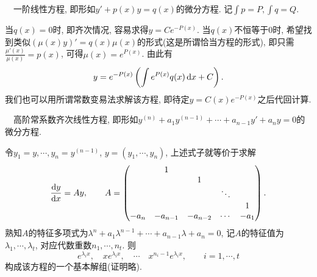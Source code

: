 ~~一阶线性方程, 即形如$y' + p(x)y=q(x)$的微分方程. 记$\int p = P, \int q = Q$. 

当$q(x)=0$时, 即齐次情况, 容易求得$y=Ce^{-P(x)}$. 当$q(x)$不恒等于$0$时, 希望找到类似$(\mu (x) y)'=q(x)\mu (x)$的形式(这是所谓恰当方程的形式), 即只需$\frac{\mu '(x)}{\mu (x)} = p(x)$, 可得$\mu (x) = e^{P(x)}$. 由此有$$y=e^{-P(x)}\left( \int e^{P(x)}q(x) \mathop{}\!\mathrm{d} x + C \right).$$
我们也可以用所谓常数变易法求解该方程, 即待定$y=C(x)e^{-P(x)}$之后代回计算. 

~~高阶常系数齐次线性方程, 即形如$y^{(n)}+a_1y^{(n-1)} + \cdots + a_{n-1}y'+a_ny=0$的微分方程. 

令$y_1=y,\cdots ,y_n=y^{(n-1)}$, $y=(y_1,\cdots ,y_n)$, 上述式子就等价于求解$$\frac{\mathop{}\!\mathrm{d} y}{\mathop{}\!\mathrm{d} x} = Ay,\qquad A=\begin{pmatrix}
  & 1 &  &  &   \\
  &  & 1 &  &   \\
  &  &  & \ddots    & \\
  &  &  &    & 1\\
 -a_n & -a_{n-1} & -a_{n-2} & \cdots  & -a_1
\end{pmatrix}.$$
熟知$A$的特征多项式为$\lambda ^n+a_1\lambda ^{n-1} + \cdots + a_{n-1}\lambda +a_n=0$, 记$A$的特征值为$\lambda _1,\cdots ,\lambda _t$, 对应代数重数$n_1,\cdots ,n_t$. 则$$e^{\lambda _ix},\quad xe^{\lambda _ix}, \quad \cdots \quad x^{n_i-1}e^{\lambda _ix},\qquad i=1,\cdots ,t$$
构成该方程的一个基本解组(证明略). 

